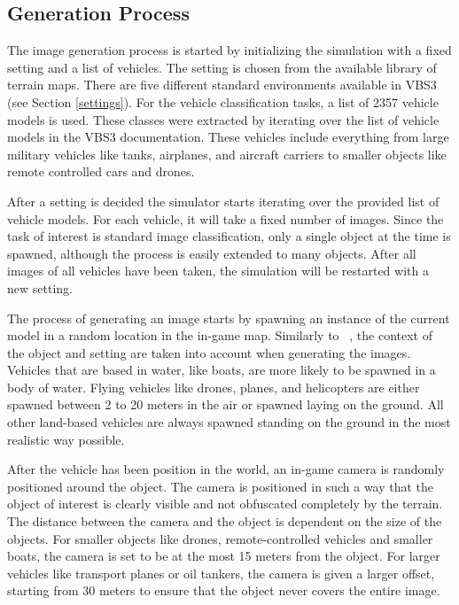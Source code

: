 \subsection{Generation Process}
The image generation process is started by initializing the simulation with a fixed setting and a list of vehicles. The setting is chosen from the available library of terrain maps. There are five different standard environments available in VBS3 (see Section \ref{settings}). For the vehicle classification tasks, a list of 2357 vehicle models is used. These classes were extracted by iterating over the list of vehicle models in the VBS3 documentation. These vehicles include everything from large military vehicles like tanks, airplanes, and aircraft carriers to smaller objects like remote controlled cars and drones. 

After a setting is decided the simulator starts iterating over the provided list of vehicle models. For each vehicle, it will take a fixed number of images. Since the task of interest is standard image classification, only a single object at the time is spawned, although the process is easily extended to many objects. After all images of all vehicles have been taken, the simulation will be restarted with a new setting.

The process of generating an image starts by spawning an instance of the current model in a random location in the in-game map. Similarly to ~\textcite{structureddomainrandomization}, the context of the object and setting are taken into account when generating the images. Vehicles that are based in water, like boats, are more likely to be spawned in a body of water. Flying vehicles like drones, planes, and helicopters are either spawned between 2 to 20 meters in the air or spawned laying on the ground. All other land-based vehicles are always spawned standing on the ground in the most realistic way possible. 

After the vehicle has been position in the world, an in-game camera is randomly positioned around the object. The camera is positioned in such a way that the object of interest is clearly visible and not obfuscated completely by the terrain. The distance between the camera and the object is dependent on the size of the objects. For smaller objects like drones, remote-controlled vehicles and smaller boats, the camera is set to be at the most 15 meters from the object. For larger vehicles like transport planes or oil tankers, the camera is given a larger offset, starting from 30 meters to ensure that the object never covers the entire image.

